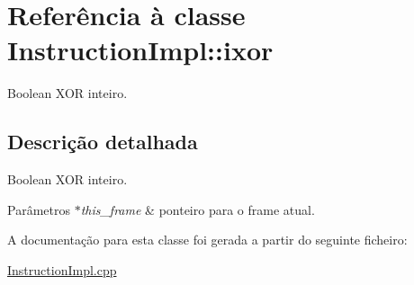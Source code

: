 \hypertarget{class_instruction_impl_1_1ixor}{}\section{Referência à classe Instruction\+Impl\+:\+:ixor}
\label{class_instruction_impl_1_1ixor}


Boolean X\+OR inteiro.  




\subsection{Descrição detalhada}
Boolean X\+OR inteiro. 


\begin{DoxyParams}{Parâmetros}
{\em $\ast$this\+\_\+frame} & ponteiro para o frame atual.  \\
\hline
\end{DoxyParams}


A documentação para esta classe foi gerada a partir do seguinte ficheiro\+:\begin{DoxyCompactItemize}
\item 
\hyperlink{_instruction_impl_8cpp}{Instruction\+Impl.\+cpp}\end{DoxyCompactItemize}
